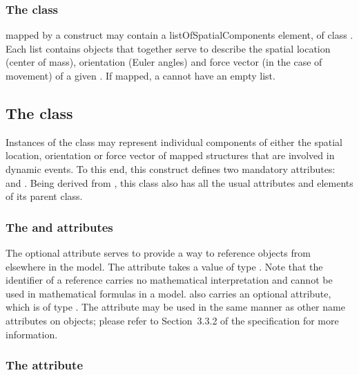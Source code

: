 \subsubsection{The  class}
\label{subsec:listSpatialComp}

\Compartments mapped by a \DynElement construct may contain a listOfSpatialComponents element, of class \ListOfSpatialComponents. Each list contains \SpatialComponent objects that together serve to describe the spatial location (center of mass), orientation (Euler angles) and force vector (in the case of movement) of a given \Compartment. If mapped, a \Compartment cannot have an empty \ListOfSpatialComponents list.

\subsection{The  class}
\label{subsec:spatialComp}

Instances of the \SpatialComponent class may represent individual components of either the spatial location, orientation or force vector of mapped \Compartment structures that are involved in dynamic events. To this end, this construct defines two mandatory attributes:  and . Being derived from \SBase, this class also has all the usual attributes and elements of its parent class.

\subsubsection{The  and  attributes}
\label{attr:idNameSpatialComp}

The optional  attribute serves to provide a way to reference \SpatialComponent objects from elsewhere in the model.
The attribute takes a value of type . Note that the identifier of a \SpatialComponent reference carries no mathematical
interpretation and cannot be used in mathematical formulas in a model. \SpatialComponent also carries an optional 
attribute, which is of type . The  attribute may be used in the same manner as other name attributes on \sbmlthreecore objects; please refer to Section~3.3.2 of the \sbmlthreecore specification for more information.

\subsubsection{The  attribute}
\label{attr:spatialIndex}

